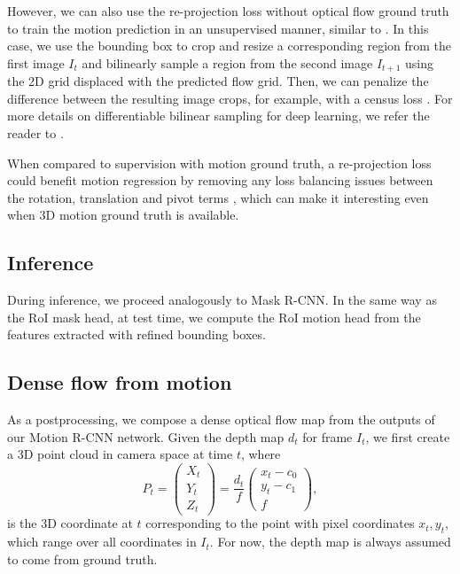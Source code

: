 However, we can also use the re-projection loss without optical flow ground truth
to train the motion prediction in an unsupervised manner, similar to \cite{SfmNet}.
In this case, we use the bounding box to crop and resize a corresponding region
from the first image $I_t$ and bilinearly sample a region from the second image $I_{t+1}$
using the 2D grid displaced with the predicted flow grid. Then, we can penalize the difference
between the resulting image crops, for example, with a census loss \cite{CensusTerm,UnFlow}.
For more details on differentiable bilinear sampling for deep learning, we refer the reader to
\cite{STN}.

When compared to supervision with motion ground truth, a re-projection
loss could benefit motion regression by removing any loss balancing issues between the
rotation, translation and pivot terms \cite{PoseNet2},
which can make it interesting even when 3D motion ground truth is available.

\subsection{Inference}
\label{ssec:inference}
During inference, we proceed analogously to Mask R-CNN.
In the same way as the RoI mask head, at test time, we compute the RoI motion head
from the features extracted with refined bounding boxes.

\subsection{Dense flow from motion}
\label{ssec:postprocessing}
As a postprocessing, we compose a dense optical flow map from the outputs of our Motion R-CNN network.
Given the depth map $d_t$ for frame $I_t$, we first create a 3D point cloud in camera space at time $t$,
where
\begin{equation}
P_t =
\begin{pmatrix}
X_t \\ Y_t \\ Z_t
\end{pmatrix}
=
\frac{d_t}{f}
\begin{pmatrix}
x_t - c_0 \\ y_t - c_1 \\ f
\end{pmatrix},
\end{equation}
is the 3D coordinate at $t$ corresponding to the point with pixel coordinates $x_t, y_t$,
which range over all coordinates in $I_t$.
For now, the depth map is always assumed to come from ground truth.

